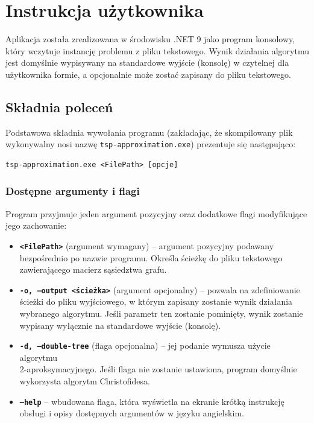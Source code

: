 \documentclass{article}
\theoremstyle{definition}
\theoremstyle{plain}
\theoremstyle{remark}
\begin{document}
\section{Instrukcja użytkownika}

Aplikacja została zrealizowana w środowisku .NET 9 jako program konsolowy, który wczytuje instancję problemu z pliku tekstowego. Wynik działania algorytmu jest domyślnie wypisywany na standardowe wyjście (konsolę) w czytelnej dla użytkownika formie, a opcjonalnie może zostać zapisany do pliku tekstowego.

\subsection{Składnia poleceń}

Podstawowa składnia wywołania programu (zakładając, że skompilowany plik wykonywalny nosi nazwę \texttt{tsp-approximation.exe}) prezentuje się następująco:

\begin{verbatim}
tsp-approximation.exe <FilePath> [opcje]
\end{verbatim}

\subsubsection{Dostępne argumenty i flagi}

Program przyjmuje jeden argument pozycyjny oraz dodatkowe flagi modyfikujące jego zachowanie:

\begin{itemize}
    \item \textbf{\texttt{<FilePath>}} (argument wymagany) -- argument pozycyjny podawany bezpośrednio po nazwie programu. Określa ścieżkę do pliku tekstowego zawierającego macierz sąsiedztwa grafu.
    \item \textbf{\texttt{-o, ---output <ścieżka>}} (argument opcjonalny) -- pozwala na zdefiniowanie ścieżki do pliku wyjściowego, w którym zapisany zostanie wynik działania wybranego algorytmu. Jeśli parametr ten zostanie pominięty, wynik zostanie wypisany wyłącznie na standardowe wyjście (konsolę).
    \item \textbf{\texttt{-d, ---double-tree}} (flaga opcjonalna) -- jej podanie wymusza użycie algorytmu \\ 2-aproksymacyjnego. Jeśli flaga nie zostanie ustawiona, program domyślnie wykorzysta algorytm Christofidesa.
    \item \textbf{\texttt{---help}} -- wbudowana flaga, która wyświetla na ekranie krótką instrukcję obsługi i opisy dostępnych argumentów w języku angielskim.
\end{itemize}
\end{document}
